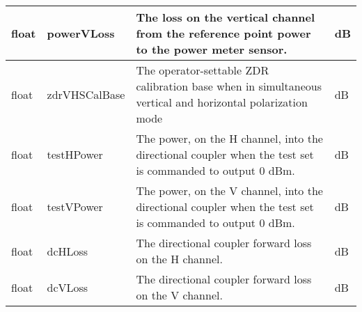 \documentclass[10pt]{article}
\newcommand{\tblspc}{\rule{0pt}{3ex}}
\begin{document}
\begin{longtable}{|p{}|l|p{}|p{}|}
\hline
\tblspc float & powerVLoss & The loss on the vertical channel from the reference point power to the power meter sensor. & dB \\
\hline
\tblspc float & zdrVHSCalBase & The operator-settable ZDR calibration base when in simultaneous vertical and horizontal polarization mode & dB \\
\hline
\tblspc float & testHPower & The power, on the H channel, into the directional coupler when the test set is commanded to output 0 dBm. & dB \\
\hline
\tblspc float & testVPower & The power, on the V channel, into the directional coupler when the test set is commanded to output 0 dBm. & dB \\
\hline
\tblspc float & dcHLoss & The directional coupler forward loss on the H channel. & dB \\
\hline
\tblspc float & dcVLoss & The directional coupler forward loss on the V channel. & dB \\
\hline
\end{longtable}
\end{document}
